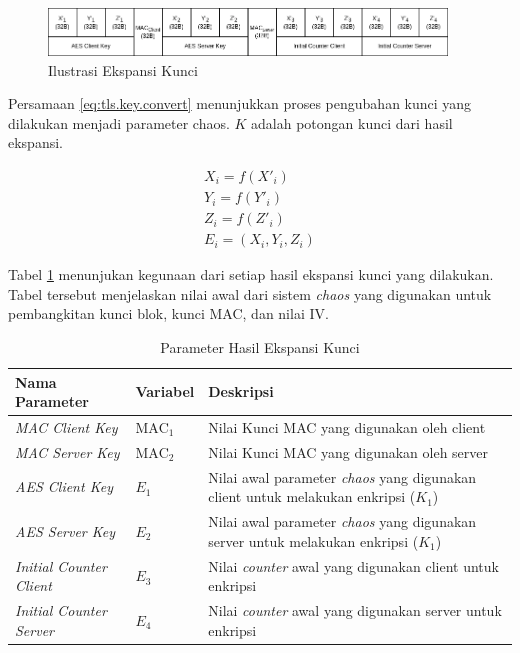 \begin{figure}[!h]
  \centering
  \includegraphics[width=400px]{chapters/res/chapter-3/img/keyexpansion.png}
  \caption{Ilustrasi Ekspansi Kunci} \label{fig:tls.keyexpansion}
\end{figure}

Persamaan \ref{eq:tls.key.convert} menunjukkan proses pengubahan kunci yang dilakukan menjadi parameter chaos. $K$ adalah potongan kunci dari hasil ekspansi.

\begin{equation}
  \begin{aligned}
    X_i = f(X'_i) \\
    Y_i = f(Y'_i) \\
    Z_i = f(Z'_i) \\
    E_i = (X_i, Y_i, Z_i)
  \end{aligned}
  \label{eq:tls.key.convert}
\end{equation}

Tabel \ref{tab:tls.keyexpansion} menunjukan kegunaan dari setiap hasil ekspansi kunci yang dilakukan. Tabel tersebut menjelaskan nilai awal dari sistem \emph{chaos} yang digunakan untuk pembangkitan kunci blok, kunci MAC, dan nilai IV.

\begin{table}[!h]
  \centering
  \caption{Parameter Hasil Ekspansi Kunci} \label{tab:tls.keyexpansion}
  \begin{tabular}{|p{3cm}|p{3cm}|p{6cm}|}
    \hline
    \textbf{Nama Parameter} & \textbf{Variabel} & \textbf{Deskripsi} \\
    \hline
    \emph{MAC Client Key} & $\text{MAC}_1$ & Nilai Kunci MAC yang digunakan oleh client \\ \hline
    \emph{MAC Server Key} & $\text{MAC}_2$ & Nilai Kunci MAC yang digunakan oleh server \\ \hline
    \emph{AES Client Key}  & $E_1$ & Nilai awal  parameter \emph{chaos} yang digunakan client untuk melakukan enkripsi ($K_1$) \\ \hline
    \emph{AES Server Key}  & $E_2$ & Nilai awal parameter \emph{chaos} yang digunakan server untuk melakukan enkripsi ($K_1$) \\ \hline
    \emph{Initial Counter Client}  & $E_3$ & Nilai \emph{counter} awal yang digunakan client untuk enkripsi \\ \hline
    \emph{Initial Counter Server}  & $E_4$ & Nilai \emph{counter} awal yang digunakan server untuk enkripsi \\
    \hline
  \end{tabular}
\end{table}

